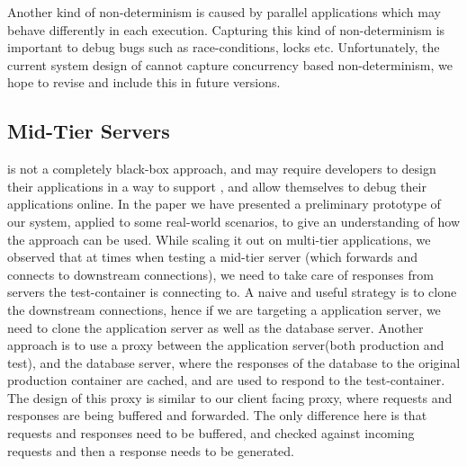 Another kind of non-determinism is caused by parallel applications which may behave differently in each execution.
Capturing this kind of non-determinism is important to debug bugs such as race-conditions, locks etc.
Unfortunately, the current system design of \parikshan cannot capture concurrency based non-determinism, we hope to revise and include this in future versions.

\subsection{Mid-Tier Servers}
\label{sec:midTier}

\parikshan is not a completely black-box approach, and may require developers to design their applications in a way to support \parikshan, and allow themselves to debug their applications online.
In the paper we have presented a preliminary prototype of our system, applied to some real-world scenarios, to give an understanding of how the approach can be used.
While scaling it out on multi-tier applications, we observed that at times when testing a mid-tier server (which forwards and connects to downstream connections), we need to take care of responses from servers the test-container is connecting to.
A naive and useful strategy is to clone the downstream connections, hence if we are targeting a application server, we need to clone the application server as well as the database server.
Another approach is to use a proxy between the application server(both production and test), and the database server, where the responses of the database to the original production container are cached, and are used to respond to the test-container.
The design of this proxy is similar to our client facing proxy, where requests and responses are being buffered and forwarded. The only difference here is that requests and responses need to be buffered, and checked against incoming requests and then a response needs to be generated. 

\fi
